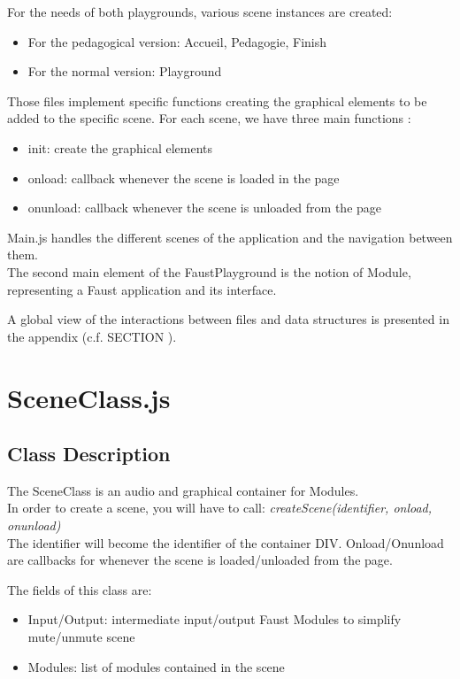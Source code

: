 \documentclass[a4paper]{article}
\begin{document}
For the needs of both playgrounds, various scene instances are created:
\begin{itemize} 
\item For the pedagogical version: Accueil, Pedagogie, Finish
\item For the normal version: Playground
\end{itemize}

Those files implement specific functions creating the graphical elements to be added to the specific scene.
For each scene, we have three main functions :
\begin{itemize}
\item init: create the graphical elements
\item onload: callback whenever the scene is loaded in the page
\item onunload: callback whenever the scene is unloaded from the page
\end{itemize}
 
 Main.js handles the different scenes of the application and the navigation between them. \\
 
 The second main element of the FaustPlayground is the notion of Module, representing a Faust application and its interface.
 
 A global view of the interactions between files and data structures is presented in the appendix (c.f. SECTION ). 

\section{SceneClass.js}

\subsection{Class Description}
The SceneClass is an audio and graphical container for Modules. \\

In order to create a scene, you will have to call: {\it createScene(identifier, onload, onunload)}\\
The identifier will become the identifier of the container DIV. Onload/Onunload are callbacks for whenever the scene is loaded/unloaded from the page.

The fields of this class are:
\begin{itemize}
\item Input/Output: intermediate input/output Faust Modules to simplify mute/unmute scene
\item Modules: list of modules contained in the scene
\end{itemize}
\end{document}
